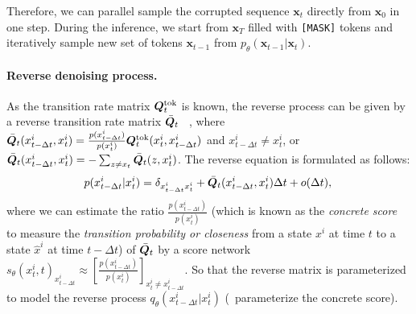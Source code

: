 Therefore, we can parallel sample the corrupted sequence $\bm{x}_t$ directly from $\bm{x}_0$ in one step. During the inference, we start from $\bm{x}_{T}$ filled with \texttt{[MASK]} tokens and iteratively sample new set of tokens $\bm{x}_{t-1}$ from $p_{\theta}(\bm{x}_{t-1}|\bm{x}_{t})$. 


\paragraph{Reverse denoising process.~~\xspace}
As the transition rate matrix ${\bm{Q}}^\text{tok}_t$ is known, the reverse process can be given by a reverse transition rate matrix $\bar{{\bm{Q}}}_t$~\cite{SCDDM:conf/iclr/SunYDSD23,kelly2011reversibility}
, where $\bar{{\bm{Q}}}_t(x^i_{t- \Delta t},x^i_t)=\frac{ p(x^i_{t- \Delta t})}{p(x^i_t)} {\bm{Q}}^\text{tok}_t(x^i_t,x^i_{t- \Delta t})$ and $x^i_{t- \Delta t}\neq x^i_t$, or $\bar{{\bm{Q}}}_t(x^i_{t- \Delta t}, x^i_t) =  - \sum_{z \neq x_t} \bar{{\bm{Q}}}_t(z,x^i_t)$. 
The reverse equation is formulated as follows: 
\begin{equation}
    \label{eq:ap_backward}
    p({x}^i_{t- \Delta t}|x^i_t) =  \delta_{{x}^i_{t- \Delta t}x^i_t} + \bar{{\bm{Q}}}_t({x}^i_{t- \Delta t},x^i_t)\Delta t + o(\Delta t),\\
\end{equation}
where we can estimate the ratio $\frac{p(x^i_{t- \Delta t})}{p(x^i_t)}$ (which is known as the \textit{concrete score}~\cite{SEDD:conf/icml/LouME24,ConcreteScoreMatch:conf/nips/MengCSE22} to measure the \textit{transition probability or closeness} from a state $x^i$ at time $t$  to a state $\hat{x}^i$ at time $t- \Delta t$) of $\bar{{\bm{Q}}}_t$ by a score network $s_\theta({x}^i_t,t)_{x^i_{t- \Delta t}} \approx [\frac{p(x^i_{t- \Delta t})}{p(x^i_t)}]_{x^i_{t}\neq x^i_{t- \Delta t}}$. 
So that the reverse matrix is parameterized to model the reverse process $q_\theta({x}^i_{t- \Delta t}|x^i_t)$ (\ie~parameterize the concrete score). 

